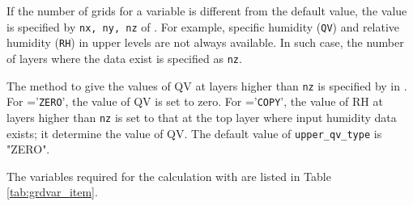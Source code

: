 If the number of grids for a variable is different from the default value, the value is specified by \verb|nx, ny, nz| of .
For example, specific humidity (\verb|QV|) and relative humidity (\verb|RH|) in upper levels are not always available.
In such case, the number of layers where the data exist is specified as \verb|nz|.

The method to give the values of QV at layers higher than \verb|nz| is specified by  in . 
For ='\verb|ZERO|', the value of QV is set to zero. 
For ='\verb|COPY|', the value of RH at layers higher than \verb|nz| is set to that at the top layer where input humidity data exists; it determine the value of QV.
The default value of \verb|upper_qv_type| is "ZERO".




The variables required for the calculation with \scalerm are listed in Table \ref{tab:grdvar_item}.


